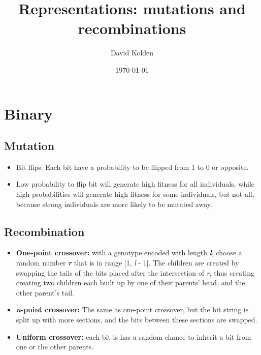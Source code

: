 \documentclass{article}
\date{\today}
\author{David Kolden}
\title{Representations: mutations and recombinations}
\begin{document}
   \maketitle
   \tableofcontents
   \section{Binary}
   \subsection{Mutation}
   \begin{itemize}
   \item Bit flips: Each bit have a probability to be flipped from 1 to 0 or opposite.
   \item Low probability to flip bit will generate high fitness for all individuals, while high probabilities will generate high fitness for some individuals, but not all, because strong individuals are more likely to be mutated away.
   \end{itemize}
   \subsection{Recombination}
   \begin{itemize}
   \item \textbf{One-point crossover:} with a genotype encoded with length \textbf{\emph{l}}, choose a random number \textbf{\emph{r}} that is in range [1, \emph{l} - 1]. The children are created by swapping the tails of the bits placed after the intersection of \emph{r}, thus creating creating two children each built up by one of their parents' head, and the other parent's tail.
   \item \textbf{\textit{n}-point crossover:} The same as one-point crossover, but the bit string is split up with more sections, and the bits between these sections are swapped.
   \item \textbf{Uniform crossover:} each bit is has a random chance to inherit a bit from one or the other parents.
   \end{itemize}
\end{document}
